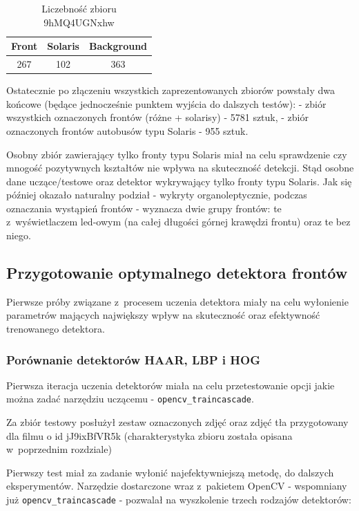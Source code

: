 \begin{table}[!h]
    \centering
    \begin{tabular}{c|c|c}
        Front   & Solaris   & Background \\ \hline
        267     & 102       & 363 
    \end{tabular}
    \caption{Liczebność zbioru 9hMQ4UGNxhw}
    \label{tab:9hMQ4UGNxhw_count}
\end{table}

Ostatecznie po złączeniu wszystkich zaprezentowanych zbiorów powstały
dwa końcowe (będące jednocześnie punktem wyjścia do dalszych testów):
- zbiór wszystkich oznaczonych frontów (różne + solarisy) - 5781 sztuk,
- zbiór oznaczonych frontów autobusów typu Solaris - 955 sztuk.

Osobny zbiór zawierający tylko fronty typu Solaris miał na celu
sprawdzenie czy mnogość pozytywnych kształtów nie wpływa na skuteczność
detekcji. Stąd osobne dane uczące/testowe oraz detektor wykrywający 
tylko fronty typu Solaris. Jak się później okazało naturalny podział
- wykryty organoleptycznie, podczas oznaczania wystąpień frontów - 
wyznacza dwie grupy frontów: te z~wyświetlaczem led-owym (na całej
długości górnej krawędzi frontu) oraz te bez niego.

\subsection{Przygotowanie optymalnego detektora frontów}

Pierwsze próby związane z~procesem uczenia detektora miały na celu 
wyłonienie parametrów mających największy wpływ na skuteczność 
oraz efektywność trenowanego detektora.

\subsubsection{Porównanie detektorów HAAR, LBP i HOG}

Pierwsza iteracja uczenia detektorów miała na celu przetestowanie
opcji jakie można zadać narzędziu uczącemu - \verb|opencv_traincascade|.

Za zbiór testowy posłużył zestaw oznaczonych zdjęć oraz zdjęć tła
przygotowany dla filmu o id jJ9ixBfVR5k (charakterystyka zbioru
została opisana w~poprzednim rozdziale)

Pierwszy test miał za zadanie wyłonić najefektywniejszą metodę, do dalszych
eksperymentów. Narzędzie dostarczone wraz z~pakietem OpenCV - wspomniany
już \verb|opencv_traincascade| - pozwalał na wyszkolenie trzech
rodzajów detektorów:

